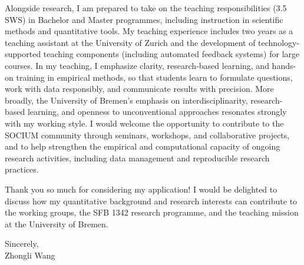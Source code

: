 \documentclass[11pt]{article}
\begin{document}
Alongside research, I am prepared to take on the teaching responsibilities (3.5 SWS) in Bachelor and Master programmes, including instruction in scientific methods and quantitative tools. 
My teaching experience includes two years as a teaching assistant at the University of Zurich and the development of technology-supported teaching components (including automated feedback systems) for large courses. 
In my teaching, I emphasize clarity, research-based learning, and hands-on training in empirical methods, so that students learn to formulate questions, work with data responsibly, and communicate results with precision.
More broadly, the University of Bremen's emphasis on interdisciplinarity, research-based learning, and openness to unconventional approaches resonates strongly with my working style. 
I would welcome the opportunity to contribute to the SOCIUM community through seminars, workshops, and collaborative projects, and to help strengthen the empirical and computational capacity of ongoing research activities, including data management and reproducible research practices.

Thank you so much for considering my application! 
I would be delighted to discuss how my quantitative background and research interests can contribute to the working groups, the SFB 1342 research programme, and the teaching mission at the University of Bremen.

\vspace{6mm}

\noindent Sincerely,\\[12mm]
\noindent Zhongli Wang
\end{document}

